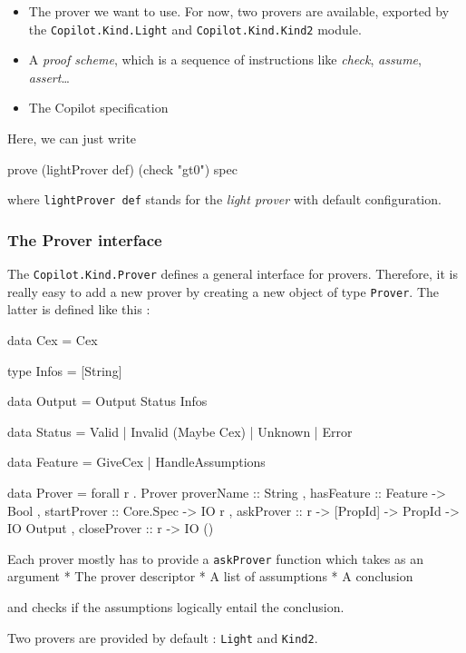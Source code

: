 \begin{itemize}
\itemsep1pt\parskip0pt
\item
  The prover we want to use. For now, two provers are available,
  exported by the \texttt{Copilot.Kind.Light} and
  \texttt{Copilot.Kind.Kind2} module.
\item
  A \emph{proof scheme}, which is a sequence of instructions like
  \emph{check}, \emph{assume}, \emph{assert}\ldots{}
\item
  The Copilot specification
\end{itemize}

Here, we can just write
\begin{code}
prove (lightProver def) (check "gt0") spec
\end{code}

where \texttt{lightProver def} stands for the \emph{light prover} with
default configuration.

\subsubsection{The Prover interface}\label{the-prover-interface}

The \texttt{Copilot.Kind.Prover} defines a general interface for
provers. Therefore, it is really easy to add a new prover by creating a
new object of type \texttt{Prover}. The latter is defined like this :

\begin{code}
data Cex = Cex

type Infos = [String]

data Output = Output Status Infos

data Status
  = Valid
  | Invalid (Maybe Cex)
  | Unknown
  | Error
  
data Feature = GiveCex | HandleAssumptions
  
data Prover = forall r . Prover 
  { proverName     :: String
  , hasFeature     :: Feature -> Bool
  , startProver    :: Core.Spec -> IO r
  , askProver      :: r -> [PropId] -> PropId -> IO Output 
  , closeProver    :: r -> IO () 
  }

\end{code}

Each prover mostly has to provide a \texttt{askProver} function which
takes as an argument * The prover descriptor * A list of assumptions * A
conclusion

and checks if the assumptions logically entail the conclusion.

Two provers are provided by default : \texttt{Light} and \texttt{Kind2}.

